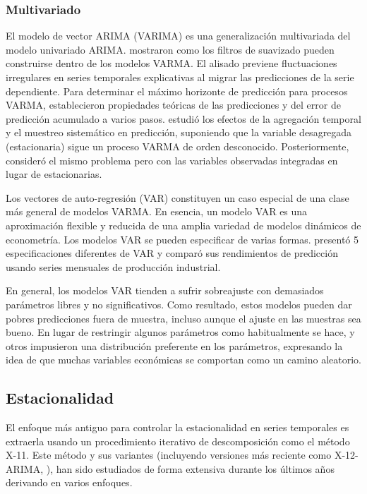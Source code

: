 \documentclass{llncs}
\begin{document}
\subsubsection{Multivariado}
El modelo de vector ARIMA (VARIMA) es una generalización multivariada del modelo univariado ARIMA. \cite{Riise1984309} mostraron como los filtros de suavizado pueden construirse dentro de los modelos VARMA. El alisado previene fluctuaciones irregulares en series temporales explicativas al migrar las predicciones de la serie dependiente. Para determinar el máximo horizonte de predicción para procesos VARMA, \cite{DeGooijer1992135} establecieron propiedades teóricas de las predicciones y del error de predicción acumulado a varios pasos. \cite{Lutkepohl1986461} estudió los efectos de la agregación temporal y el muestreo sistemático en predicción, suponiendo que la variable desagregada (estacionaria) sigue un proceso VARMA de orden desconocido. Posteriormente, \cite{Bidarkota1998457} consideró el mismo problema pero con las variables observadas integradas en lugar de estacionarias.

Los vectores de auto-regresión (VAR) constituyen un caso especial de una clase más general de modelos VARMA. En esencia, un modelo VAR es una aproximación flexible y reducida de una amplia variedad de modelos dinámicos de econometría. Los modelos VAR se pueden especificar de varias formas. \cite{Funke1990363} presentó 5 especificaciones diferentes de VAR y comparó sus rendimientos de predicción usando series mensuales de producción industrial.

En general, los modelos VAR tienden a sufrir sobreajuste con demasiados parámetros libres y no significativos. Como resultado, estos modelos pueden dar pobres predicciones fuera de muestra, incluso aunque el ajuste en las muestras sea bueno. En lugar de restringir algunos parámetros como habitualmente se hace, \cite{Litterman198625} y otros impusieron una distribución preferente en los parámetros, expresando la idea de que muchas variables económicas se comportan como un camino aleatorio. 

\subsection{Estacionalidad}
El enfoque más antiguo para controlar la estacionalidad en series temporales es extraerla usando un procedimiento iterativo de descomposición como el método X-11. Este método y sus variantes (incluyendo versiones más reciente como X-12-ARIMA, \cite{Findley1998127}), han sido estudiados de forma extensiva durante los últimos años derivando en varios enfoques.
\end{document}
